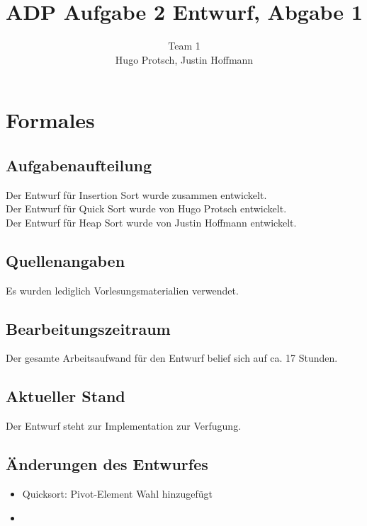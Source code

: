 \documentclass[11pt]{article}
\title{ADP Aufgabe 2 Entwurf, Abgabe 1}
\author{Team 1\\Hugo Protsch, Justin Hoffmann}
\begin{document}
    \maketitle

    \tableofcontents

    \newpage


    \section{Formales}\label{sec:Formales}


    \subsection*{Aufgabenaufteilung}
    Der Entwurf für Insertion Sort wurde zusammen entwickelt.\\
    Der Entwurf für Quick Sort wurde von Hugo Protsch entwickelt.\\
    Der Entwurf für Heap Sort wurde von Justin Hoffmann entwickelt.

    \subsection*{Quellenangaben}
    Es wurden lediglich Vorlesungsmaterialien verwendet.

    \subsection*{Bearbeitungszeitraum}
    Der gesamte Arbeitsaufwand für den Entwurf belief sich auf ca. 17 Stunden.


    \subsection*{Aktueller Stand}
    Der Entwurf steht zur Implementation zur Verfugung.

    \subsection*{Änderungen des Entwurfes}
    \begin{itemize}
        \item Quicksort: Pivot-Element Wahl hinzugefügt
        \item
    \end{itemize}
\end{document}
